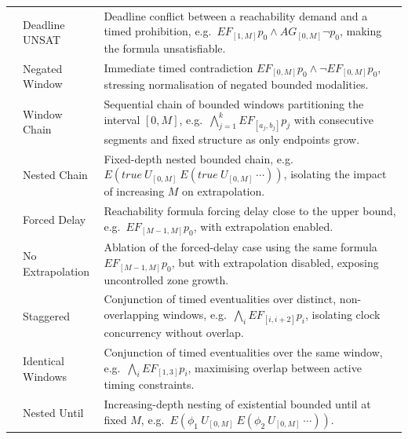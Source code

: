 \begin{longtable}{@{}ll|p{}@{}}
& Deadline UNSAT
& Deadline conflict between a reachability demand and a timed prohibition, e.g.\
  $EF_{[1,M]} p_0 \wedge AG_{[0,M]} \neg p_0$,
  making the formula unsatisfiable. \\

& Negated Window
& Immediate timed contradiction
  $EF_{[0,M]} p_0 \wedge \neg EF_{[0,M]} p_0$,
  stressing normalisation of negated bounded modalities. \\

& Window Chain
& Sequential chain of bounded windows partitioning the interval $[0,M]$, e.g.\
  $\bigwedge_{j=1}^{k} EF_{[a_j,b_j]} p_j$
  with consecutive segments and fixed structure as only endpoints grow. \\

& Nested Chain
& Fixed-depth nested bounded chain,
  e.g.\ $E(\mathit{true}\ U_{[0,M]}\ E(\mathit{true}\ U_{[0,M]}\ \cdots))$,
  isolating the impact of increasing $M$ on extrapolation. \\

& Forced Delay
& Reachability formula forcing delay close to the upper bound, e.g.\
  $EF_{[M-1,M]} p_0$,
  with extrapolation enabled. \\

& No Extrapolation
& Ablation of the forced-delay case using the same formula
  $EF_{[M-1,M]} p_0$,
  but with extrapolation disabled, exposing uncontrolled zone growth. \\

\midrule

& Staggered
& Conjunction of timed eventualities over distinct, non-overlapping windows,
  e.g.\ $\bigwedge_i EF_{[i,i+2]} p_i$,
  isolating clock concurrency without overlap. \\

& Identical Windows
& Conjunction of timed eventualities over the same window,
  e.g.\ $\bigwedge_i EF_{[1,3]} p_i$,
  maximising overlap between active timing constraints. \\

\midrule

& Nested Until
& Increasing-depth nesting of existential bounded until at fixed $M$,
  e.g.\ $E(\phi_1\ U_{[0,M]}\ E(\phi_2\ U_{[0,M]}\ \cdots))$. \\


\end{longtable}
